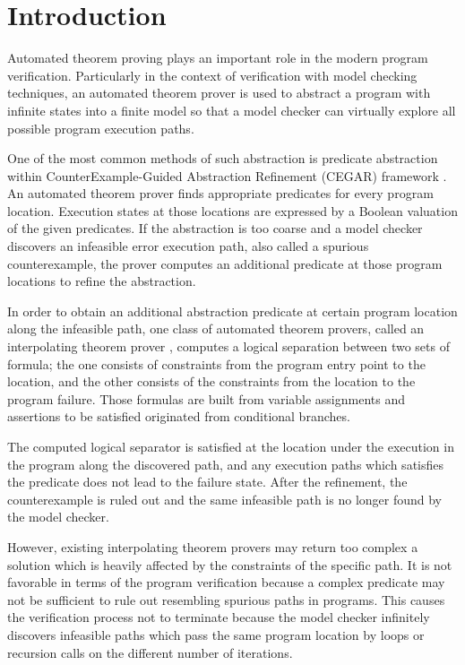 \chapter{Introduction}

Automated theorem proving plays an important role in the modern
program verification.  Particularly in the context of verification
with model checking techniques, an automated theorem prover is used to
abstract a program with infinite states into a finite model so that a
model checker can virtually explore all possible program execution
paths.

One of the most common methods of such abstraction is predicate
abstraction\cite{conf/cav/GrafS97} within CounterExample-Guided
Abstraction Refinement (CEGAR) framework
\cite{conf/cav/ClarkeGJLV00,conf/popl/BallR02,conf/popl/HenzingerJMS02}.
An automated theorem prover finds appropriate predicates for every
program location.  Execution states at those locations are expressed
by a Boolean valuation of the given predicates.  If the abstraction is
too coarse and a model checker discovers an infeasible error execution
path, also called a spurious counterexample, the prover computes an
additional predicate at those program locations to refine the
abstraction.

In order to obtain an additional abstraction predicate at certain
program location along the infeasible path, one class of automated
theorem provers, called an interpolating theorem prover
\cite{journals/tcs/McMillan05,conf/vmcai/RybalchenkoS07}, computes a
logical separation between two sets of formula; the one consists of
constraints from the program entry point to the location, and the
other consists of the constraints from the location to the program
failure.  Those formulas are built from variable assignments and
assertions to be satisfied originated from conditional branches.

The computed logical separator is satisfied at the location under the
execution in the program along the discovered path, and any execution
paths which satisfies the predicate does not lead to the failure
state.  After the refinement, the counterexample is ruled out and the
same infeasible path is no longer found by the model checker.

However, existing interpolating theorem provers may return too complex
a solution which is heavily affected by the constraints of the
specific path.  It is not favorable in terms of the program
verification because a complex predicate may not be sufficient to rule
out resembling spurious paths in programs.  This causes the
verification process not to terminate because the model checker
infinitely discovers infeasible paths which pass the same program
location by loops or recursion calls on the different number of
iterations.

